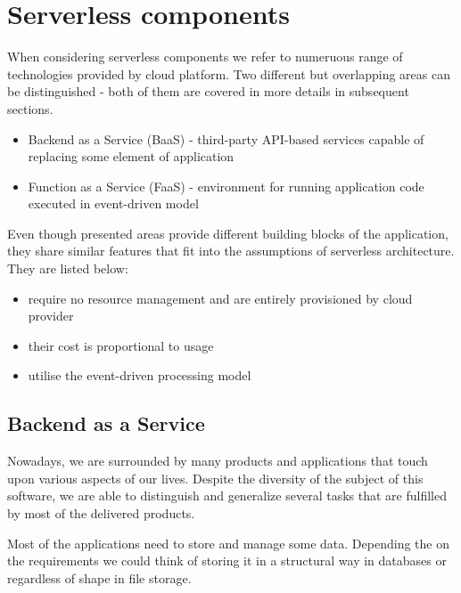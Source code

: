 \section{Serverless components}

When considering serverless components we refer to numeruous range of technologies provided by cloud platform. Two different but overlapping areas can be distinguished - both of them are covered in more details in subsequent sections.

\begin{itemize}
    \item Backend as a Service (BaaS) - third-party API-based services capable of replacing some element of application
    \item Function as a Service (FaaS) - environment for running application code executed in event-driven model
\end{itemize}


Even though presented areas provide different building blocks of the application, they share similar features that fit into the assumptions of serverless architecture. They are listed below: 

\begin{itemize}
    \item require no resource management and are entirely provisioned by cloud provider
    \item their cost is proportional to usage
    \item utilise the event-driven processing model
\end{itemize}

\subsection{Backend as a Service}


Nowadays, we are surrounded by many products and applications that touch upon various aspects of our lives. Despite the diversity of the subject of this software, we are able to distinguish and generalize several tasks that are fulfilled by most of the delivered products. 

Most of the applications need to store and manage some data. Depending the on the requirements we could think of storing it in a structural way in databases or regardless of shape in file storage.

